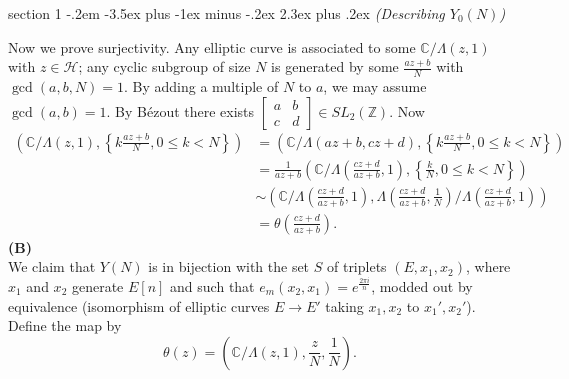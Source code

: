 \documentclass[12pt]{article}
\makeatletter
\theoremstyle{norm}
\newcommand{\C}[0]{\mathbb{C}}
\newcommand{\Z}[0]{\mathbb{Z}}
\providecommand{\cal}[1]{\mathcal{#1}}
\renewcommand{\cal}[1]{\mathcal{#1}}
\newcommand{\rc}[1]{\frac{1}{#1}}
\newcommand{\ga}[0]{\gamma}
\newcommand{\Ga}[0]{\Gamma}
\newcommand{\La}[0]{\Lambda}
\newcommand{\bc}[1]{\left\{ {#1} \right\}}
\newcommand{\pa}[1]{\left( {#1} \right)}
\newcommand{\subprob}[1]{\noindent\textbf{#1}\\}
\newcommand{\coltwo}[2]{
\left[
\begin{matrix}
{#1}\\
{#2} 
\end{matrix}
\right]}
\newcommand{\smatt}[4]{
\left[
\begin{smallmatrix}
{#1}&{#2}\\
{#3}&{#4}
\end{smallmatrix}
\right]}
\newenvironment{problem}{\@startsection
       {section}
       {1}
       {-.2em}
       {-3.5ex plus -1ex minus -.2ex}
       {2.3ex plus .2ex}
       {\pagebreak[3]%
       \large\bf\noindent{Problem }
       }
       }
       {%
       }
\makeatother
\begin{document}
\begin{problem}{\it (Describing $Y_0(N)$)}
%

Now we prove surjectivity. Any elliptic curve is associated to some $\C/\La(z,1)$ with $z\in \cal H$; any cyclic subgroup of size $N$ is generated by some $\frac{az+b}{N}$ with $\gcd(a,b,N)=1$. By adding a multiple of $N$ to $a$, we may assume $\gcd(a,b)=1$. By B\'ezout there exists $\smatt ab{c}d\in SL_2(\Z)$. Now
\begin{align*}
\pa{\C/\La(z,1),\bc{k\frac{az+b}{N},0\le k< N}}&
= \pa{\C/\La(az+b,cz+d),\bc{k\frac{az+b}{N},0\le k< N}}\\
&=\rc{az+b}\pa{\C/\La\pa{\frac{cz+d}{az+b},1},\bc{\frac{k}{N},0\le k<N}}\\
&\sim \pa{\C/\La\pa{\frac{cz+d}{az+b},1},\La\pa{\frac{cz+d}{az+b},\rc N}/\La\pa{\frac{cz+d}{az+b},1}}\\
&=\theta\pa{\frac{cz+d}{az+b}}.
\end{align*}
\subprob{(B)}
We claim that $Y(N)$ is in bijection with the set $S$ of triplets $(E,x_1,x_2)$, where $x_1$ and $x_2$ generate $E[n]$ and such that $e_m(x_2,x_1)=e^{\frac{2\pi i}{n}}$, modded out by equivalence (isomorphism of elliptic curves $E\to E'$ taking $x_1,x_2$ to $x_1',x_2'$).
Define the map by
\[
\theta(z)=\pa{\C/\La(z,1), \frac{z}{N}, \rc N}.
\]


\end{problem}
\end{document}
